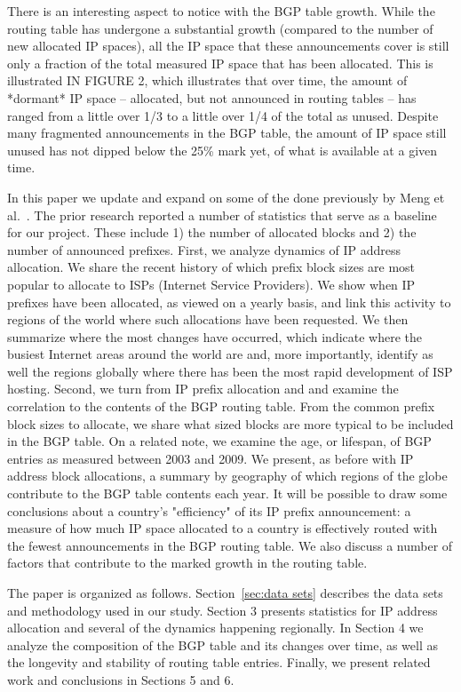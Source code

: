 There is an interesting aspect to notice with the BGP table growth.  While the routing table has undergone a substantial growth (compared to the number of new allocated IP spaces), all the IP space that these announcements cover is still only a fraction of the total measured IP space that has been allocated.  This is illustrated IN FIGURE 2, which illustrates that over time, the amount of *dormant* IP space -- allocated, but not announced in routing tables -- has ranged from a little over 1/3 to a little over 1/4 of the total as unused.  Despite many fragmented announcements in the BGP table, the amount of IP space still unused has not dipped below the 25\% mark yet, of what is available at a given time.

In this paper we update and expand on some of the done previously by Meng et al.~\cite{Meng:2005:IPv4-address}.  The prior research reported a number of statistics that serve as a baseline for our project.  These include 1) the number of allocated blocks and 2) the number of announced prefixes.  First, we analyze dynamics of IP address allocation.  We share the recent history of which prefix block sizes are most popular to allocate to ISPs (Internet Service Providers).  We show when IP prefixes have been allocated, as viewed on a yearly basis, and link this activity to regions of the world where such allocations have been requested.  We then summarize where the most changes have occurred, which indicate where the busiest Internet areas around the world are and, more importantly, identify as well the regions globally where there has been the most rapid development of ISP hosting.  Second, we turn from IP prefix allocation and and examine the correlation to the contents of the BGP routing table.  From the common prefix block sizes to allocate, we share what sized blocks are more typical to be included in the BGP table.  On a related note, we examine the age, or lifespan, of BGP entries as measured between 2003 and 2009.  We present, as before with IP address block allocations, a summary by geography of which regions of the globe contribute to the BGP table contents each year.  It will be possible to draw some conclusions about a country's "efficiency" of its IP prefix announcement: a measure of how much IP space allocated to a country is effectively routed with the fewest announcements in the BGP routing table.  We also discuss a number of factors that contribute to the marked growth in the routing table.

The paper is organized as follows.  Section~\ref{sec:data sets} describes the data sets and methodology used in our study.  Section 3 presents statistics for IP address allocation and several of the dynamics happening regionally.  In Section 4 we analyze the composition of the BGP table and its changes over time, as well as the longevity and stability of routing table entries.  Finally, we present related work and conclusions in Sections 5 and 6.

